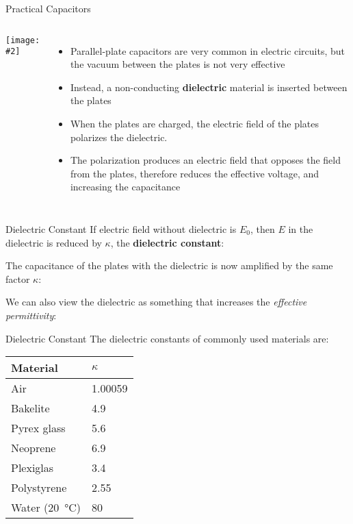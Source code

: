 \documentclass[12pt,aspectratio=169]{beamer}
\newcommand{\pic}[2]{\texttt{[image: \#2]}}
\newcommand{\eq}[2]{\vspace{#1}{\Large\begin{displaymath}#2\end{displaymath}}}
\begin{document}
\begin{frame}{Practical Capacitors}
  \begin{columns}
    \pic{1.15}{Figure_20_05_05a}
    \begin{itemize}
    \item Parallel-plate capacitors are very common in electric circuits,
      but the vacuum between the plates is not very effective
    \item Instead, a non-conducting \textbf{dielectric} material is inserted
      between the plates
    \item When the plates are charged, the electric field of the plates
      polarizes the dielectric.
    \item The polarization  produces an electric field that opposes the field
      from the plates, therefore reduces the effective voltage, and increasing
      the capacitance
    \end{itemize}
  \end{columns}
\end{frame}



\begin{frame}{Dielectric Constant}
  If electric field without dielectric is $E_0$, then $E$ in the dielectric is
  reduced by $\kappa$, the \textbf{dielectric constant}:

  \eq{-.25in}{
    \boxed{\kappa=\frac{E_0}{E}}
  }

  The capacitance of the plates with the dielectric is now amplified by the
  same factor $\kappa$:

  \eq{-.3in}{
    \boxed{C=\kappa C_0}
  }

  We can also view the dielectric as something that increases the
  \emph{effective permittivity}:
  
  \eq{-.3in}{
    \boxed{\epsilon=\kappa\epsilon_0}
  }
\end{frame}



\begin{frame}{Dielectric Constant}
  The dielectric constants of commonly used materials are:
  \begin{center}
    \begin{tabular}{l|l}
      \rowcolor{pink}
      \textbf{Material} & $\kappa$ \\ \hline
      Air         & \num{1.00059} \\
      Bakelite    & \num{4.9} \\
      Pyrex glass & \num{5.6} \\
      Neoprene    & \num{6.9} \\
      Plexiglas   & \num{3.4} \\
      Polystyrene & \num{2.55} \\
      Water (\SI{20}{\celsius}) & \num{80} 
    \end{tabular}
  \end{center}
\end{frame}
\end{document}

